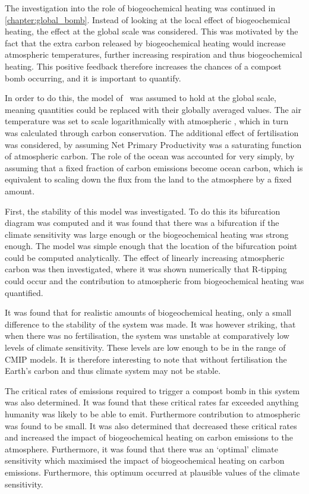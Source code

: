The investigation into the role of biogeochemical heating was continued in \cref{chapter:global_bomb}. Instead of looking at the local effect of biogeochemical heating,
the effect at the global scale was considered. This was motivated by the fact that the extra carbon released by biogeochemical heating would increase atmospheric temperatures,
further increasing respiration and thus biogeochemical heating.
This positive feedback therefore increases the chances of a compost bomb occurring, and it is important to quantify.

In order to do this, the model of~\cite{Luke2011} was assumed to hold at the global scale, meaning quantities could be replaced with their globally averaged values. The air temperature
was set to scale logarithmically with atmospheric , which in turn was calculated through carbon conservation. The additional effect of  fertilisation was considered,
by assuming Net Primary Productivity was a saturating function of atmospheric carbon. The role of the ocean was accounted for very simply, by assuming that a fixed fraction of
carbon emissions become ocean carbon, which is equivalent to scaling down the flux from the land to the atmosphere by a fixed amount.

First, the stability of this model was investigated. To do this its bifurcation diagram was computed and it was found that there was a bifurcation if the climate sensitivity was large enough
or the biogeochemical heating was strong enough. The model was simple enough that the location of the bifurcation point could be computed analytically. The effect of linearly increasing
atmospheric carbon was then investigated, where it was shown numerically that R-tipping could occur and the contribution to atmospheric  from biogeochemical heating was quantified.

It was found that for realistic amounts of biogeochemical heating, only a small difference to the stability of the system was made. It was however striking, that when there was no
 fertilisation, the system was unstable at comparatively low levels of climate sensitivity. These levels are low enough to be in the range of CMIP models. It is therefore interesting to note
that without  fertilisation the Earth's carbon and thus climate system may not be stable.

The critical rates of emissions required to trigger a compost bomb in this system was also determined. It was found that these critical rates far exceeded anything humanity was likely to be able
to emit. Furthermore contribution to atmospheric  was found to be small. It was also determined that  decreased these critical rates and increased the impact of
biogeochemical heating on carbon emissions to the atmosphere. Furthermore, it was found that there was an `optimal' climate sensitivity which maximised the impact of biogeochemical heating
on carbon emissions. Furthermore, this optimum occurred at plausible values of the climate sensitivity.

